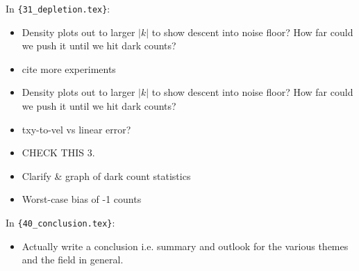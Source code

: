 In \verb|{31_depletion.tex}|:
\begin{itemize}
\item {Density plots out to larger $|k|$ to show descent into noise floor? How far could we push it until we hit dark counts?}
\item {cite more experiments}
\item {Density plots out to larger $|k|$ to show descent into noise floor? How far could we push it until we hit dark counts?}
\item {txy-to-vel vs linear error?}
\item {CHECK THIS 3.}
\item {Clarify \& graph of dark count statistics}
\item {Worst-case bias of -1 counts}
\end{itemize}
In \verb|{40_conclusion.tex}|:
\begin{itemize}
\item {Actually write a conclusion i.e. summary and outlook for the various themes and the field in general.}
\end{itemize}
